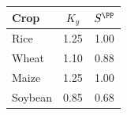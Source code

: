 \begin{tabular}{lcc}
\toprule
Crop & $K_y$ & $S^{\PP}$\\
\midrule
Rice & 1.25 & 1.00 \\
Wheat & 1.10 & 0.88 \\
Maize & 1.25 & 1.00 \\
Soybean & 0.85 & 0.68 \\
\bottomrule
\end{tabular}

